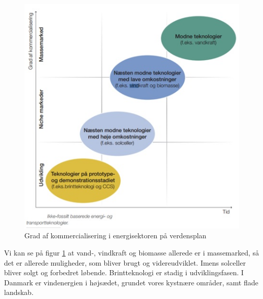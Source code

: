 \begin{figure}[H]
\includegraphics[scale=0.85]{Billeder/Baeredygtige_energiiniti}
\caption{Grad af kommercialisering i energisektoren på verdensplan}
\label{fig:Massemarked}
\end{figure}
Vi kan se på figur \ref{fig:Massemarked} at vand-, vindkraft og biomasse allerede er i massemarked, så det er allerede muligheder, som bliver brugt og videreudviklet. Imens solceller bliver solgt og forbedret løbende. Brintteknologi er stadig i udviklingsfasen.
I Danmark er vindenergien i højsædet, grundet vores kystnære områder, samt flade landskab.